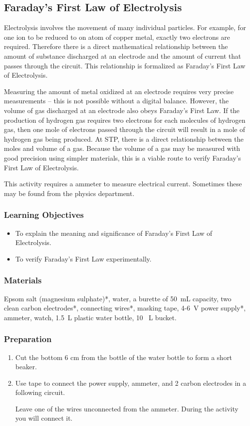 \subsection{Faraday's First Law of Electrolysis}

Electrolysis involves the movement of many individual particles. For example, for one  ion to be reduced to on atom of copper metal, exactly two electrons are required. Therefore there is a direct mathematical relationship between the amount of substance discharged at an electrode and the amount of current that passes through the circuit. This relationship is formalized as Faraday's First Law of Electrolysis.

Measuring the amount of metal oxidized at an electrode requires very precise measurements -- this is not possible without a digital balance. However, the volume of gas discharged at an electrode also obeys Faraday's First Law. If the production of hydrogen gas requires two electrons for each molecules of hydrogen gas, then one mole of electrons passed through the circuit will result in a mole of hydrogen gas being produced. At STP, there is a direct relationship between the moles and volume of a gas. Because the volume of a gas may be measured with good precision using simpler materials, this is a viable route to verify Faraday's First Law of Electrolysis.

This activity requires a ammeter to measure electrical current. Sometimes these may be found from the physics department.

\subsubsection*{Learning Objectives}
\begin{itemize}
\item{To explain the meaning and significance of Faraday's First Law of Electrolysis.}
\item{To verify Faraday's First Law experimentally.}
\end{itemize}

\subsubsection*{Materials}
Epsom salt (magnesium sulphate)*, water, a burette of 50~mL capacity, two clean carbon electrodes*, connecting wires*, masking tape, 4-6~V power supply*, ammeter, watch, 1.5~L plastic water bottle, 10~ L bucket.

\subsubsection*{Preparation}
\begin{enumerate}
\item{Cut the bottom 6 cm from the bottle of the water bottle to form a short beaker.}
\item{Use tape to connect the power supply, ammeter, and 2 carbon electrodes in a following circuit. }

Leave one of the wires unconnected from the ammeter. During the activity you will connect it.
\end{enumerate}

